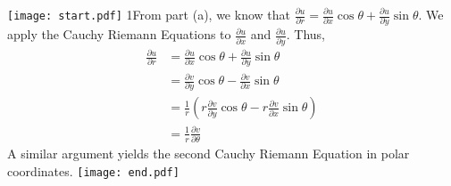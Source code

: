 \documentclass[12pt]{article}
\begin{document}
\begin{enumerate}
\begin{enumerate}
\texttt{[image: start.pdf]}
{{{1\linewidth}{From part (a), we know that $\frac{\partial u}{\partial r}=\frac{\partial u}{\partial x}\cos{\theta}+\frac{\partial u}{\partial y}\sin{\theta}$.  We apply the Cauchy Riemann Equations to $\frac{\partial u}{\partial x}$ and $\frac{\partial u}{\partial y}$.  Thus, 
\begin{align*}
\frac{\partial u}{\partial r}&=\frac{\partial u}{\partial x}\cos{\theta}+\frac{\partial u}{\partial y}\sin{\theta}\\
&=\frac{\partial v}{\partial y}\cos{\theta}-\frac{\partial v}{\partial x}\sin{\theta}\\
&=\frac{1}{r}\left(r\frac{\partial v}{\partial y}\cos{\theta}-r\frac{\partial v}{\partial x}\sin{\theta}\right)\\
&=\frac{1}{r}\frac{\partial v}{\partial \theta}
\end{align*}
A similar argument yields the second Cauchy Riemann Equation in polar coordinates.
}}}
\texttt{[image: end.pdf]}




\end{enumerate}

\end{enumerate}
\end{document}
